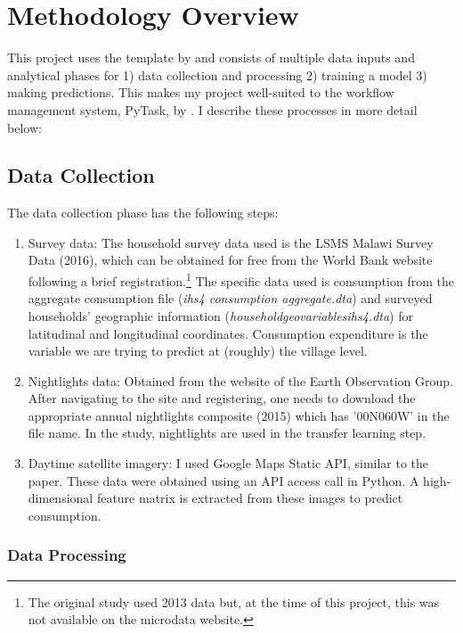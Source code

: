 \documentclass[11pt, a4paper, leqno]{article}
\begin{document}
\section{Methodology Overview} 
 This project uses the template by \citet{GaudeckerEconProjectTemplates} and consists of multiple data inputs and analytical phases for 1) data collection and processing 2) training a model 3) making predictions. This makes my project well-suited to the workflow management system, PyTask, by \citet{Raabe2020}. I describe these processes in more detail below:

\subsection{Data Collection}

 The data collection phase has the following steps: \vspace{-0.2cm}
\begin{enumerate}
	\item Survey data: The household survey data used is the LSMS Malawi Survey Data (2016), which can be obtained for free from the World Bank website following a brief registration.\footnote{The original study used 2013 data but, at the time of this project, this was not available on the microdata website.} The specific data used is consumption from the aggregate consumption file (\textit{ihs4 consumption aggregate.dta}) and surveyed households' geographic information (\textit{householdgeovariablesihs4.dta}) for latitudinal and longitudinal coordinates. Consumption expenditure is the variable we are trying to predict at (roughly) the village level.
	\item Nightlights data: Obtained from the website of the Earth Observation Group. After navigating to the site and registering, one needs to download the appropriate annual nightlights composite (2015) which has '00N060W' in the file name. In the study, nightlights are used in the transfer learning step.
	\item Daytime satellite imagery: I used Google Maps Static API, similar to the paper. These data were obtained using an API access call in Python. A high-dimensional feature matrix is extracted from these images to predict consumption.
\end{enumerate}

\subsubsection{Data Processing}
\end{document}
